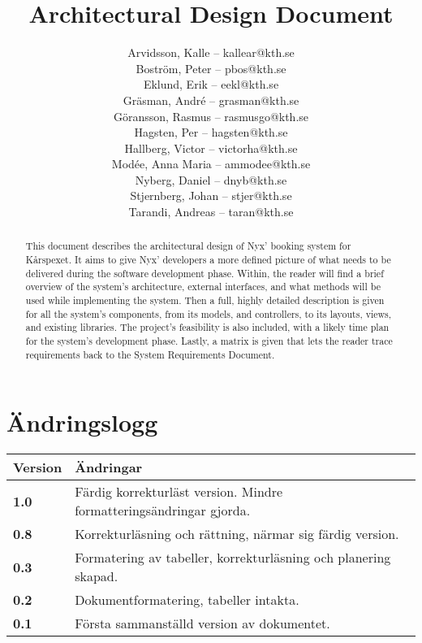 \documentclass[a4paper, twoside, 11pt, titlepage]{article}
\author{
	\small
	Arvidsson, Kalle -- kallear@kth.se\\
	Boström, Peter -- pbos@kth.se\\
	Eklund, Erik -- eekl@kth.se\\
	Gräsman, André -- grasman@kth.se\\
	Göransson, Rasmus -- rasmusgo@kth.se\\
	Hagsten, Per -- hagsten@kth.se\\
	Hallberg, Victor -- victorha@kth.se\\
	Modée, Anna Maria -- ammodee@kth.se\\
	Nyberg, Daniel -- dnyb@kth.se\\
	Stjernberg, Johan -- stjer@kth.se\\
	Tarandi, Andreas -- taran@kth.se
	}
\title{Architectural Design Document}
\begin{document}
\maketitle

\clearpage
\thispagestyle{empty}
\mbox{}
\newpage

\begin{abstract}
	This document describes the architectural design of Nyx' booking system for Kårspexet. It aims to give Nyx' developers  a more defined picture of what needs to be delivered during the software development phase.
Within, the reader will find a brief overview of the system's architecture, external interfaces, and what methods will be used while implementing the system. Then a full, highly detailed description is given for all the system's components, from its models, and controllers, to its layouts, views, and existing libraries. The project's feasibility is also included, with a likely time plan for the system's development phase. Lastly, a matrix is given that lets the reader trace requirements back to the System Requirements Document.
\end{abstract}

\newpage

\setcounter{page}{1}

\startfooter

\clearpage
\section*{Ändringslogg}


\begin {table} [ht] \begin{tabular} { p{2.6cm} p{12.5cm} }
	\hline
	{\sffamily\textbf{Version}} & {\sffamily\textbf{Ändringar}} \\
	\hline
	{\sffamily\textbf{1.0}} & {Färdig korrekturläst version. Mindre formatteringsändringar gjorda.} \\
	\hline
	{\sffamily\textbf{0.8}} & {Korrekturläsning och rättning, närmar sig färdig version.} \\
	\hline
	{\sffamily\textbf{0.3}} & {Formatering av tabeller, korrekturläsning och planering skapad.} \\
	\hline
	{\sffamily\textbf{0.2}} & {Dokumentformatering, tabeller intakta.} \\
	\hline
	{\sffamily\textbf{0.1}} & {Första sammanställd version av dokumentet.} \\
	\hline
\end{tabular} \end{table} \FloatBarrier
\end{document}
